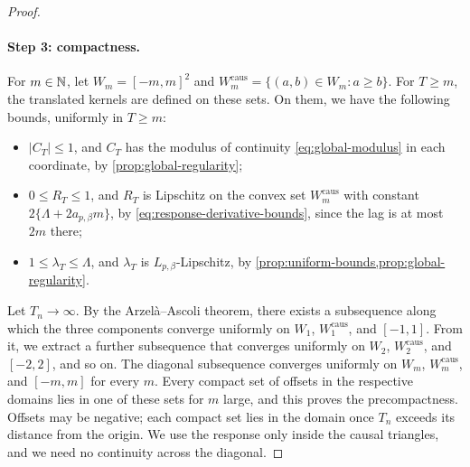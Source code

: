 \begin{proof}
\paragraph{Step 3: compactness.}
For $m\in\mathbb N$, let $W_m=[-m,m]^2$ and $W_m^{\mathrm{caus}}=\{(a,b)\in W_m:a\ge b\}$. For $T\ge m$, the translated kernels are defined on these sets. On them, we have the following bounds, uniformly in $T\ge m$:
\begin{itemize}
\item $|C_T|\le1$, and $C_T$ has the modulus of continuity \eqref{eq:global-modulus} in each coordinate, by \cref{prop:global-regularity};
\item $0\le R_T\le1$, and $R_T$ is Lipschitz on the convex set $W_m^{\mathrm{caus}}$ with constant $2\{\Lambda+2a_{p,\beta}m\}$, by \eqref{eq:response-derivative-bounds}, since the lag is at most $2m$ there;
\item $1\le\lambda_T\le\Lambda$, and $\lambda_T$ is $L_{p,\beta}$-Lipschitz, by \cref{prop:uniform-bounds,prop:global-regularity}.
\end{itemize}
Let $T_n\to\infty$. By the Arzel\`a--Ascoli theorem, there exists a subsequence along which the three components converge uniformly on $W_1$, $W_1^{\mathrm{caus}}$, and $[-1,1]$. From it, we extract a further subsequence that converges uniformly on $W_2$, $W_2^{\mathrm{caus}}$, and $[-2,2]$, and so on. The diagonal subsequence converges uniformly on $W_m$, $W_m^{\mathrm{caus}}$, and $[-m,m]$ for every $m$. Every compact set of offsets in the respective domains lies in one of these sets for $m$ large, and this proves the precompactness. Offsets may be negative; each compact set lies in the domain once $T_n$ exceeds its distance from the origin. We use the response only inside the causal triangles, and we need no continuity across the diagonal.
\end{proof}
